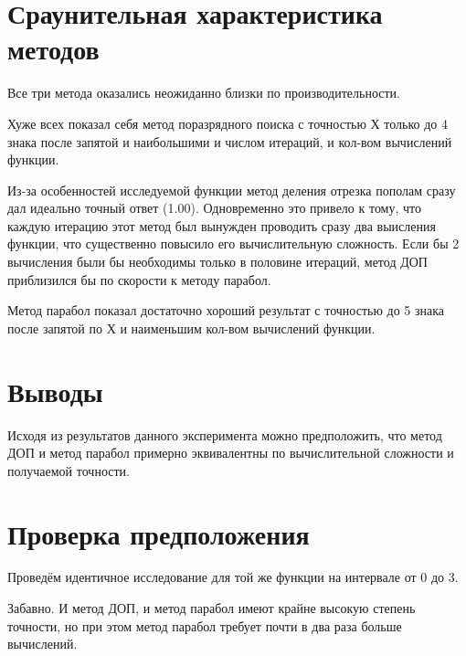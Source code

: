 \documentclass[12pt, letterpaper]{article}
\begin{document}
\section{Сраунительная характеристика методов}
Все три метода оказались неожиданно близки по производительности.

Хуже всех показал себя метод поразрядного поиска с точностью Х только до 4 знака после запятой и наибольшими и числом итераций, и кол-вом вычислений функции.

Из-за особенностей исследуемой функции метод деления отрезка пополам сразу дал идеально точный ответ (1.00).
Одновременно это привело к тому, что каждую итерацию этот метод был вынужден проводить сразу два выисления функции, что существенно повысило его вычислительную сложность.
Если бы 2 вычисления были бы необходимы только в половине итераций, метод ДОП приблизился бы по скорости к методу парабол.

Метод парабол показал достаточно хороший результат с точностью до 5 знака после запятой по Х и наименьшим кол-вом вычислений функции.

\section{Выводы} 
Исходя из результатов данного эксперимента можно предположить, что метод ДОП и метод парабол примерно эквивалентны по вычислительной сложности и получаемой точности.

\section{Проверка предположения}
Проведём идентичное исследование для той же функции на интервале от 0 до 3.
\begin{center}
    \small
\end{center}
Забавно. И метод ДОП, и метод парабол имеют крайне высокую степень точности, но при этом метод парабол требует почти в два раза больше вычислений.
\end{document}

